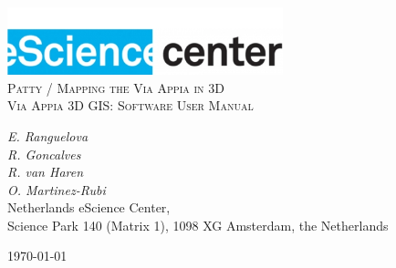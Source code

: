 \documentclass[a4paper,11pt]{article}
\begin{document}
\begin{titlepage}
\begin{center}
\includegraphics[width=0.6\textwidth]{fig/logo}\\[3cm]    
\textsc{\LARGE Patty / Mapping the Via Appia in 3D}\\[0.5cm]
\textsc{\large Via Appia 3D GIS: Software User Manual}\\[0.5cm]
\vfill
\end{center}
{\large
\emph{E. Ranguelova} \\
\emph{R. Goncalves } \\
\emph{R. van Haren } \\
\emph{O. Martinez-Rubi } \\
}
{\large
{Netherlands eScience Center, \\
Science Park 140 (Matrix 1), 1098 XG Amsterdam, the Netherlands\\
}
}
\begin{center}
{\large \today}
\end{center}
\end{titlepage}

\tableofcontents

\newpage











\end{document}
